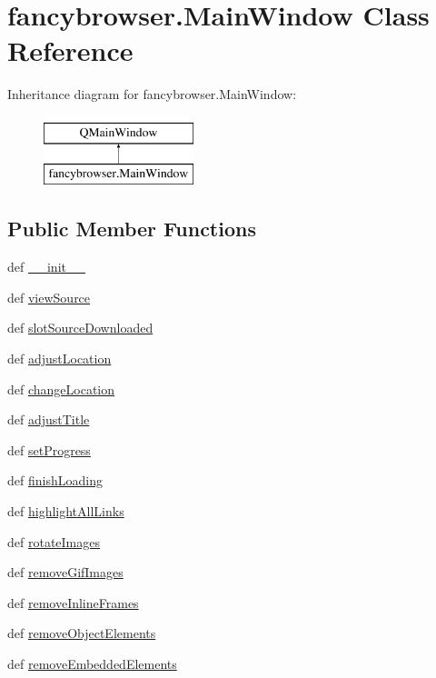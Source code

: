 \hypertarget{classfancybrowser_1_1MainWindow}{}\section{fancybrowser.\+Main\+Window Class Reference}
\label{classfancybrowser_1_1MainWindow}
Inheritance diagram for fancybrowser.\+Main\+Window\+:\begin{figure}[H]
\begin{center}
\leavevmode
\includegraphics[height=2.000000cm]{classfancybrowser_1_1MainWindow}
\end{center}
\end{figure}
\subsection*{Public Member Functions}
\begin{DoxyCompactItemize}
\item 
def \hyperlink{classfancybrowser_1_1MainWindow_af223cc8f8bdd659b7e49dde8183021e2}{\+\_\+\+\_\+init\+\_\+\+\_\+}
\item 
def \hyperlink{classfancybrowser_1_1MainWindow_abf93147b09a9c55418ae12c652c51a00}{view\+Source}
\item 
def \hyperlink{classfancybrowser_1_1MainWindow_ad281607b00b482e643971fd553c2ba11}{slot\+Source\+Downloaded}
\item 
def \hyperlink{classfancybrowser_1_1MainWindow_a84f36888a647697db8f91c04b9867ab9}{adjust\+Location}
\item 
def \hyperlink{classfancybrowser_1_1MainWindow_a6a4c661a948ce4f52404730299589112}{change\+Location}
\item 
def \hyperlink{classfancybrowser_1_1MainWindow_a8967708bb899df14b48cfdad1aac1a62}{adjust\+Title}
\item 
def \hyperlink{classfancybrowser_1_1MainWindow_a4a55f66f5d0d4d9ee53775570158c35c}{set\+Progress}
\item 
def \hyperlink{classfancybrowser_1_1MainWindow_adf4481fb2000d4d6a2c080c1d94da065}{finish\+Loading}
\item 
def \hyperlink{classfancybrowser_1_1MainWindow_afaddc533aa82b3272e8efbd0ce6f376c}{highlight\+All\+Links}
\item 
def \hyperlink{classfancybrowser_1_1MainWindow_a284e496fa51ae6b2777275077ddc323a}{rotate\+Images}
\item 
def \hyperlink{classfancybrowser_1_1MainWindow_ad45212d19eaa4d083f52c8bd783cce9c}{remove\+Gif\+Images}
\item 
def \hyperlink{classfancybrowser_1_1MainWindow_a80abab8f2d5bd3bae562971747181688}{remove\+Inline\+Frames}
\item 
def \hyperlink{classfancybrowser_1_1MainWindow_ad7bc848c2f57bfc680013f56265a3fa6}{remove\+Object\+Elements}
\item 
def \hyperlink{classfancybrowser_1_1MainWindow_afa85cb877f43bb749850c2f522b4d9f2}{remove\+Embedded\+Elements}
\end{DoxyCompactItemize}
